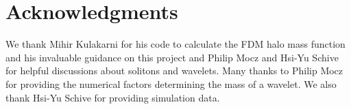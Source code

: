 \documentclass[usenatbib]{mnras}
\begin{document}
\section*{Acknowledgments}
We thank Mihir Kulakarni for his code to calculate the FDM halo mass function and his invaluable guidance on this project and Philip Mocz and Hsi-Yu Schive for helpful discussions about solitons and wavelets. Many thanks to Philip Mocz for providing the numerical factors determining the mass of a wavelet. We also thank Hsi-Yu Schive for providing simulation data. 




 
\end{document}
